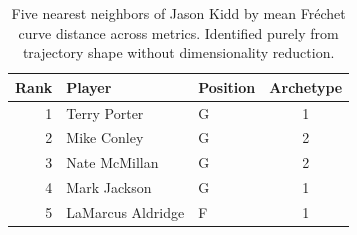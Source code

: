 \begin{table}[htbp]
  \centering\small
  \begin{tabular}{rllc}
    \toprule
    Rank & Player & Position & Archetype \\
    \midrule
    1 & Terry Porter & G & 1 \\
    2 & Mike Conley & G & 2 \\
    3 & Nate McMillan & G & 2 \\
    4 & Mark Jackson & G & 1 \\
    5 & LaMarcus Aldridge & F & 1 \\
    \bottomrule
  \end{tabular}
  \caption{Five nearest neighbors of Jason Kidd by mean Fr\'{e}chet curve distance across metrics. Identified purely from trajectory shape without dimensionality reduction.}
  \label{tab:Jason_Kidd_frechet_curve_neighbors}
\end{table}

